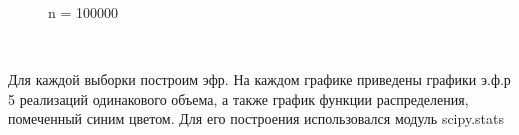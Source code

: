 \documentclass[a4paper,12pt, oneside]{book}
\begin{document}
\begin{figure}[h!]
\begin{center}
\begin{minipage}[h]{0.47\linewidth}
	\end{minipage}
	\hfill
	\begin{minipage}[h]{0.47\linewidth}
		 n = 100000 \\
	\end{minipage}
	\end{center}
\end{figure}



\newpage
{}\\
\vspace{5mm}

Для каждой выборки построим эфр. На каждом графике приведены графики э.ф.р 5 реализаций одинакового объема, а также график функции распределения, помеченный синим цветом.  Для его построения использовался модуль scipy.stats \\
\vspace{5mm}
\end{document}

